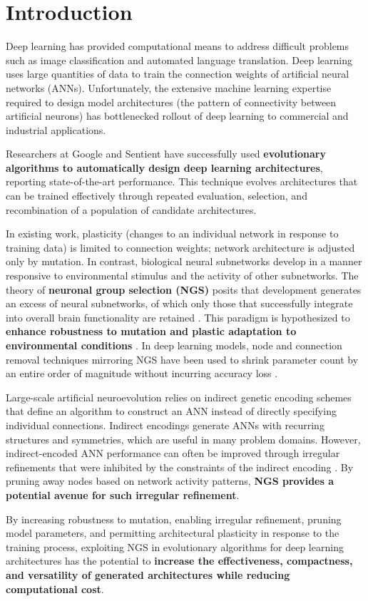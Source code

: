 \section{Introduction}

Deep learning has provided computational means to address difficult problems such as image classification and automated language translation.
Deep learning uses large quantities of data to train the connection weights of artificial neural networks (ANNs).
Unfortunately, the extensive machine learning expertise required to design model architectures (the pattern of connectivity between artificial neurons) has bottlenecked rollout of deep learning to commercial and industrial applications.

Researchers at Google \cite{real2017large} and Sentient \cite{miikkulainen2017evolving} have successfully used \textbf{evolutionary algorithms to automatically design deep learning architectures}, reporting state-of-the-art performance.
This technique evolves architectures that can be trained effectively through repeated evaluation, selection, and recombination of a population of candidate architectures.

In existing work, plasticity (changes to an individual network in response to training data) is limited to connection weights;
network architecture is adjusted only by mutation.
In contrast, biological neural subnetworks develop in a manner responsive to environmental stimulus and the activity of other subnetworks.
The theory of \textbf{neuronal group selection (NGS)} posits that development generates an excess of neural subnetworks, of which only those that successfully integrate into overall brain functionality are retained \cite{sanes2011development}.
This paradigm is hypothesized to \textbf{enhance robustness to mutation and plastic adaptation to environmental conditions} \cite{downing2015intelligence}.
In deep learning models, node and connection removal techniques mirroring NGS have been used to shrink parameter count by an entire order of magnitude without incurring accuracy loss \cite{song2015learning}.

Large-scale artificial neuroevolution relies on indirect genetic encoding schemes that define an algorithm to construct an ANN instead of directly specifying individual connections.
Indirect encodings generate ANNs with recurring structures and symmetries, which are useful in many problem domains.
However, indirect-encoded ANN performance can often be improved through irregular refinements that were inhibited by the constraints of the indirect encoding \cite{clune2011performance}.
By pruning away nodes based on network activity patterns, \textbf{NGS provides a potential avenue for such irregular refinement}.

By increasing robustness to mutation, enabling irregular refinement, pruning model parameters, and permitting architectural plasticity in response to the training process, exploiting NGS in evolutionary algorithms for deep learning architectures has the potential to \textbf{increase the effectiveness, compactness, and versatility of generated architectures while reducing computational cost}.
